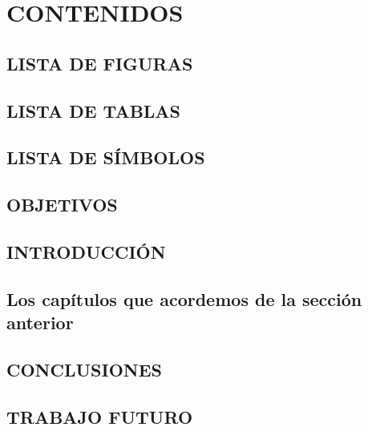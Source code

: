 \chapter{CONTENIDOS}

\section*{LISTA DE FIGURAS}

\section*{LISTA DE TABLAS}

\section*{LISTA DE SÍMBOLOS}

\section*{OBJETIVOS}

\section*{INTRODUCCIÓN}

\section*{\textcolor{mycolor}{Los capítulos que acordemos de 
la sección anterior}}

\section*{CONCLUSIONES}

\section*{TRABAJO FUTURO}